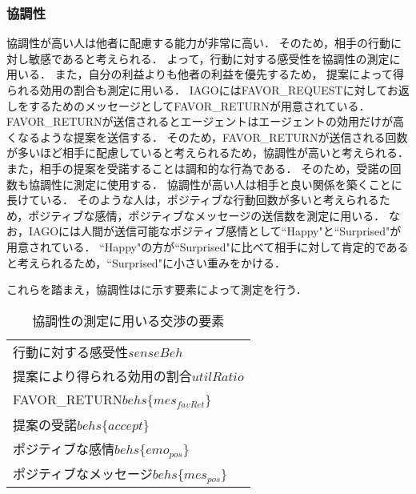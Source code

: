 \subsubsection{協調性}
協調性が高い人は他者に配慮する能力が非常に高い．
そのため，相手の行動に対し敏感であると考えられる．
よって，行動に対する感受性を協調性の測定に用いる．
また，自分の利益よりも他者の利益を優先するため，
提案によって得られる効用の割合も測定に用いる．
IAGOにはFAVOR\_REQUESTに対してお返しをするためのメッセージとしてFAVOR\_RETURNが用意されている．
FAVOR\_RETURNが送信されるとエージェントはエージェントの効用だけが高くなるような提案を送信する．
そのため，FAVOR\_RETURNが送信される回数が多いほど相手に配慮していると考えられるため，協調性が高いと考えられる．
また，相手の提案を受諾することは調和的な行為である．
そのため，受諾の回数も協調性に測定に使用する．
協調性が高い人は相手と良い関係を築くことに長けている．
そのような人は，ポジティブな行動回数が多いと考えられるため，ポジティブな感情，ポジティブなメッセージの送信数を測定に用いる．
なお，IAGOには人間が送信可能なポジティブ感情として“Happy"と“Surprised"が用意されている．
“Happy"の方が“Surprised"に比べて相手に対して肯定的であると考えられるため，“Surprised"に小さい重みをかける．

これらを踏まえ，協調性はに示す要素によって測定を行う．

\begin{table}[tb]
    \centering
    \caption{協調性の測定に用いる交渉の要素}
    \begin{tabular}{l} \toprule
        行動に対する感受性$senseBeh$ \\
        提案により得られる効用の割合$utilRatio$  \\
        FAVOR\_RETURN$behs\{mes_{\mathit{favRet}}\}$ \\
        提案の受諾$behs\{accept\}$ \\ 
        ポジティブな感情$behs\{emo_{pos}\}$ \\
        ポジティブなメッセージ$behs\{mes_{pos}\}$ \\ \bottomrule
    \end{tabular}
    \label{tab:agreeableness}
\end{table}

